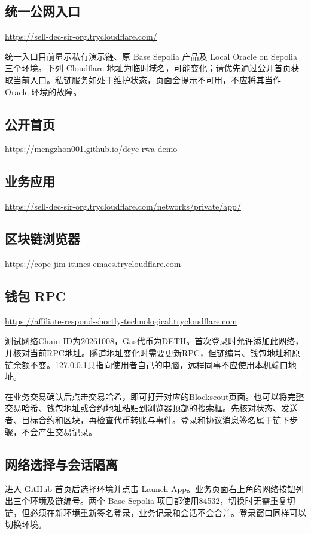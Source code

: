 \documentclass[12pt,a4paper]{article}
\begin{document}
\subsection{统一公网入口}
\url{https://sell-dec-sir-org.trycloudflare.com/}\par
统一入口目前显示私有演示链、原 Base Sepolia 产品及 Local Oracle on Sepolia 三个环境。下列 Cloudflare 地址为临时域名，可能变化；请优先通过公开首页获取当前入口。私链服务如处于维护状态，页面会提示不可用，不应将其当作 Oracle 环境的故障。

\subsection{公开首页}
\url{https://mengzhon001.github.io/deye-rwa-demo}\par
\subsection{业务应用}
\url{https://sell-dec-sir-org.trycloudflare.com/networks/private/app/}\par
\subsection{区块链浏览器}
\url{https://cope-jim-itunes-emacs.trycloudflare.com}\par
\subsection{钱包 RPC}
\url{https://affiliate-respond-shortly-technological.trycloudflare.com}\par
测试网络Chain ID为20261008，Gas代币为DETH。首次登录时允许添加此网络，并核对当前RPC地址。隧道地址变化时需要更新RPC，但链编号、钱包地址和原链余额不变。127.0.0.1只指向使用者自己的电脑，远程同事不应使用本机端口地址。

在业务交易确认后点击交易哈希，即可打开对应的Blockscout页面。也可以将完整交易哈希、钱包地址或合约地址粘贴到浏览器顶部的搜索框。先核对状态、发送者、目标合约和区块，再检查代币转账与事件。登录和协议消息签名属于链下步骤，不会产生交易记录。

\subsection{网络选择与会话隔离}
进入 GitHub 首页后选择环境并点击 Launch App。业务页面右上角的网络按钮列出三个环境及链编号。两个 Base Sepolia 项目都使用84532，切换时无需重复切链，但必须在新环境重新签名登录，业务记录和会话不会合并。登录窗口同样可以切换环境。
\end{document}
